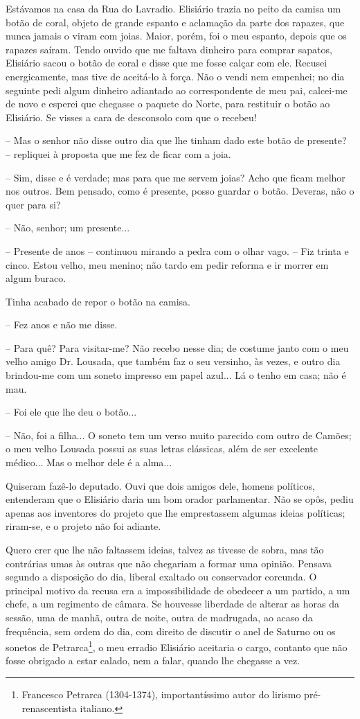 Estávamos na casa da Rua do Lavradio. Elisiário trazia no peito da
camisa um botão de coral, objeto de grande espanto e aclamação da parte
dos rapazes, que nunca jamais o viram com joias. Maior, porém, foi o meu
espanto, depois que os rapazes saíram. Tendo ouvido que me faltava
dinheiro para comprar sapatos, Elisiário sacou o botão de coral e disse
que me fosse calçar com ele. Recusei energicamente, mas tive de
aceitá-lo à força. Não o vendi nem empenhei; no dia seguinte pedi algum
dinheiro adiantado ao correspondente de meu pai, calcei-me de novo e
esperei que chegasse o paquete do Norte, para restituir o botão ao
Elisiário. Se visses a cara de desconsolo com que o recebeu!

-- Mas o senhor não disse outro dia que lhe tinham dado este botão de
presente? -- repliquei à proposta que me fez de ficar com a joia.

-- Sim, disse e é verdade; mas para que me servem joias? Acho que ficam
melhor nos outros. Bem pensado, como é presente, posso guardar o botão.
Deveras, não o quer para si?

-- Não, senhor; um presente...

-- Presente de anos -- continuou mirando a pedra com o olhar vago. --
Fiz trinta e cinco. Estou velho, meu menino; não tardo em pedir reforma
e ir morrer em algum buraco.

Tinha acabado de repor o botão na camisa.

-- Fez anos e não me disse.

-- Para quê? Para visitar-me? Não recebo nesse dia; de costume janto com
o meu velho amigo Dr. Lousada, que também faz o seu versinho, às vezes,
e outro dia brindou-me com um soneto impresso em papel azul... Lá o
tenho em casa; não é mau.

-- Foi ele que lhe deu o botão...

-- Não, foi a filha... O soneto tem um verso muito parecido com outro de
Camões; o meu velho Lousada possui as suas letras clássicas, além de ser
excelente médico... Mas o melhor dele é a alma...

Quiseram fazê-lo deputado. Ouvi que dois amigos dele, homens políticos,
entenderam que o Elisiário daria um bom orador parlamentar. Não se opôs,
pediu apenas aos inventores do projeto que lhe emprestassem algumas
ideias políticas; riram-se, e o projeto não foi adiante.

Quero crer que lhe não faltassem ideias, talvez as tivesse de sobra, mas
tão contrárias umas às outras que não chegariam a formar uma opinião.
Pensava segundo a disposição do dia, liberal exaltado ou conservador
corcunda. O principal motivo da recusa era a impossibilidade de obedecer
a um partido, a um chefe, a um regimento de câmara. Se houvesse
liberdade de alterar as horas da sessão, uma de manhã, outra de noite,
outra de madrugada, ao acaso da frequência, sem ordem do dia, com
direito de discutir o anel de Saturno ou os sonetos de
Petrarca\footnote{Francesco Petrarca (1304-1374), importantíssimo autor
  do lirismo pré-renascentista italiano.}, o meu erradio Elisiário
aceitaria o cargo, contanto que não fosse obrigado a estar calado, nem a
falar, quando lhe chegasse a vez.

